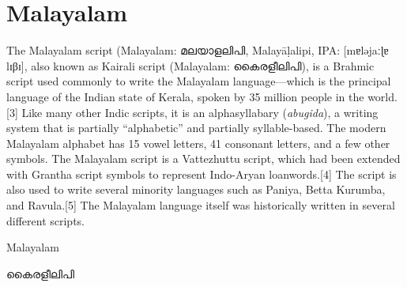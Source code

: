 \section{Malayalam}

\newfontfamily{}

\def\malamtext#1{{\malayam#1}}

The Malayalam script (Malayalam: \malamtext{മലയാളലിപി}, Malayāḷalipi, IPA: [mɐləjaːɭɐ lɪβɪ], also known as Kairali script (Malayalam: \malamtext{കൈരളീലിപി}), is a Brahmic script used commonly to write the Malayalam language—which is the principal language of the Indian state of Kerala, spoken by 35 million people in the world.[3] Like many other Indic scripts, it is an alphasyllabary (\textit{abugida}), a writing system that is partially “alphabetic” and partially syllable-based. The modern Malayalam alphabet has 15 vowel letters, 41 consonant letters, and a few other symbols. The Malayalam script is a Vattezhuttu script, which had been extended with Grantha script symbols to represent Indo-Aryan loanwords.[4] The script is also used to write several minority languages such as Paniya, Betta Kurumba, and Ravula.[5] The Malayalam language itself was historically written in several different scripts.

\begin{scriptexample}[]{Malayalam}
\centerline{\Huge\malamtext{കൈരളീലിപി}}
\end{scriptexample}
